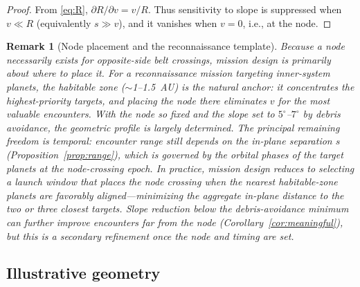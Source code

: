 \documentclass{article}
\newtheorem{remark}{Remark}
\begin{document}
\begin{proof}
From \eqref{eq:R}, $\partial R/\partial v = v/R$. Thus sensitivity to slope is suppressed when $v\ll R$ (equivalently $s\gg v$), and it vanishes when $v=0$, i.e., at the node.
\end{proof}

\begin{remark}[Node placement and the reconnaissance template]
\label{rem:recon_template}
Because a node necessarily exists for opposite-side belt crossings, mission design is primarily about where to place it. For a reconnaissance mission targeting inner-system planets, the habitable zone ($\sim$1--1.5~AU) is the natural anchor: it concentrates the highest-priority targets, and placing the node there eliminates $v$ for the most valuable encounters. With the node so fixed and the slope set to $5^\circ$--$7^\circ$ by debris avoidance, the geometric profile is largely determined. The principal remaining freedom is temporal: encounter range still depends on the in-plane separation $s$ (Proposition~\ref{prop:range}), which is governed by the orbital phases of the target planets at the node-crossing epoch. In practice, mission design reduces to selecting a launch window that places the node crossing when the nearest habitable-zone planets are favorably aligned---minimizing the aggregate in-plane distance to the two or three closest targets. Slope reduction below the debris-avoidance minimum can further improve encounters far from the node (Corollary~\ref{cor:meaningful}), but this is a secondary refinement once the node and timing are set.
\end{remark}


\subsection{Illustrative geometry}
\label{sec:figure_geometry}
\end{document}
